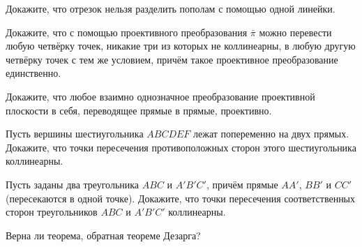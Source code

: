 \documentclass[12pt]{article}
\begin{document}
Докажите, что отрезок нельзя разделить пополам с помощью одной линейки.

Докажите, что с помощью проективного преобразования $\bar\pi$ можно перевести
любую четвёрку точек, никакие три из которых не коллинеарны, в любую другую четвёрку точек с тем же условием, причём такое проективное преобразование единственно.

Докажите, что любое взаимно однозначное преобразование проективной плоскости в себя, переводящее прямые в прямые, проективно.

Пусть вершины шестиугольника $ABCDEF$ лежат попеременно на двух прямых.
Докажите, что точки пересечения противоположных сторон этого шестиугольника коллинеарны.

Пусть заданы два треугольника $ABC$ и $A'B'C'$, причём прямые $AA'$, $BB'$ и $CC'$  (пересекаются в одной точке). Докажите, что точки пересечения
соответственных сторон треугольников $ABC$ и $A'B'C'$ коллинеарны.

Верна ли теорема, обратная теореме Дезарга?

\end{document}
